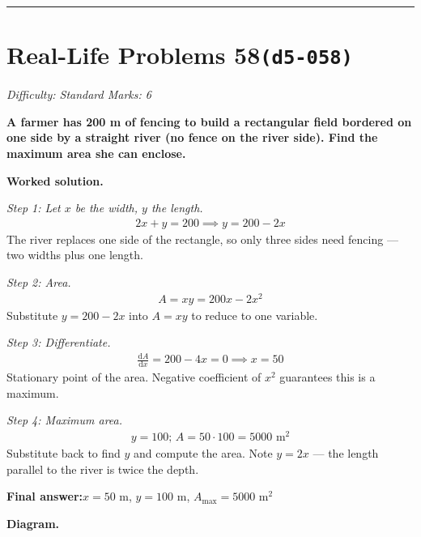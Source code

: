 \documentclass[11pt]{article}
\newcommand{\question}[1]{\par\medskip\noindent\textbf{#1}\par}
\begin{document}
\medskip\hrule

\section*{Real-Life Problems 58\quad\small\texttt{(d5-058)}}
\textit{Difficulty: Standard \quad\textbar\quad Marks: 6}

\question{A farmer has 200 m of fencing to build a rectangular field bordered on one side by a straight river (no fence on the river side). Find the maximum area she can enclose.}

\textbf{Worked solution.}

\textit{Step 1: Let \( x \) be the width, \( y \) the length.}
\[\begin{gathered}
2x + y = 200 \implies y = 200 - 2x
\end{gathered}\]
The river replaces one side of the rectangle, so only three sides need fencing --- two widths plus one length.

\textit{Step 2: Area.}
\[\begin{gathered}
A = xy = 200x - 2x^2
\end{gathered}\]
Substitute \( y = 200 - 2x \) into \( A = xy \) to reduce to one variable.

\textit{Step 3: Differentiate.}
\[\begin{gathered}
\frac{\mathrm{d}A}{\mathrm{d}x} = 200 - 4x = 0 \implies x = 50
\end{gathered}\]
Stationary point of the area. Negative coefficient of \( x^2 \) guarantees this is a maximum.

\textit{Step 4: Maximum area.}
\[\begin{gathered}
y = 100; \, A = 50 \cdot 100 = 5000 \text{ m}^2
\end{gathered}\]
Substitute back to find \( y \) and compute the area. Note \( y = 2x \) --- the length parallel to the river is twice the depth.

\begin{answerbox}
\textbf{Final answer:}\quad \(\displaystyle  x = 50 \) m, \(\displaystyle  y = 100 \) m, \(\displaystyle  A_{\max} = 5000 \text{ m}^2 \)
\end{answerbox}
\textbf{Diagram.}
\end{document}
